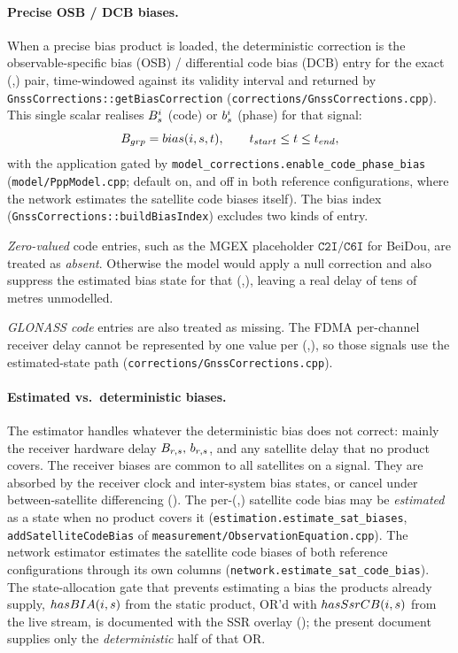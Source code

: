 \documentclass[main.tex]{subfiles}
\begin{document}
\paragraph{Precise OSB / DCB biases.}
When a precise bias product is loaded, the deterministic correction is the
observable-specific bias (OSB) / differential code bias (DCB) entry for the
exact (\sat,\sigl) pair, time-windowed against its validity interval and
returned by \texttt{GnssCorrections::getBiasCorrection}
(\texttt{corrections/GnssCorrections.cpp}).  This single scalar realises
$B^i_s$ (code) or $b^i_s$ (phase) for that signal:
\begin{equation}
B_{grp} = bias(i,s,t),
\qquad
t_{start} \le t \le t_{end},
\label{eq:obsphys-bias-window}
\end{equation}
with the application gated by
\texttt{model\_corrections.enable\_code\_phase\_bias} (\texttt{model/PppModel.cpp};
default on, and off in both reference configurations, where the network
estimates the satellite code biases itself).  The
bias index (\texttt{GnssCorrections::buildBiasIndex}) excludes two kinds
of entry.

\emph{Zero-valued} code entries, such as the MGEX placeholder
$\mathtt{C2I}/\mathtt{C6I}$ for BeiDou, are treated as \emph{absent}.
Otherwise the model would apply a null correction and also suppress the
estimated bias state for that (\sat,\sigl), leaving a real delay of tens
of metres unmodelled.

\emph{GLONASS code} entries are also treated as missing.  The FDMA
per-channel receiver delay cannot be represented by one value per
(\sat,\sigl), so those signals use the estimated-state path
(\texttt{corrections/GnssCorrections.cpp}).

\paragraph{Estimated vs.\ deterministic biases.}
The estimator handles whatever the deterministic bias does not correct:
mainly the receiver hardware delay $B_{r,s},\,b_{r,s}$, and
any satellite delay that no product covers.  The receiver biases are
common to all satellites on a signal.  They are absorbed by the receiver
clock and inter-system bias states, or cancel under between-satellite
differencing ().  The
per-(\sat,\sigl) satellite code bias may be \emph{estimated} as a state
when no product
covers it (\texttt{estimation.estimate\_sat\_biases},
\texttt{addSatelliteCodeBias} of \texttt{measurement/ObservationEquation.cpp}).
The network estimator estimates the satellite code biases of both
reference configurations through its own columns
(\texttt{network.estimate\_sat\_code\_bias}).
The state-allocation gate
that prevents estimating a bias the products already supply,
$hasBIA(i,s)$ from the static product, OR'd with
$hasSsrCB(i,s)$ from the live stream, is documented with
the SSR overlay (); the present document supplies only the
\emph{deterministic} half of that OR.
\end{document}
